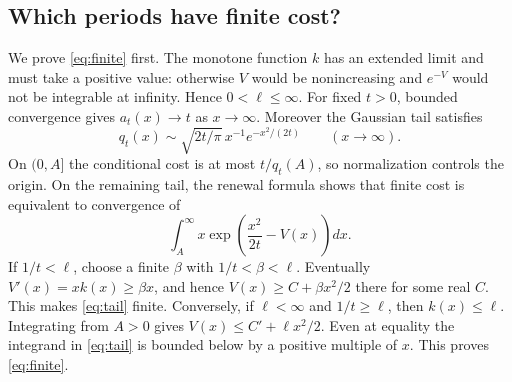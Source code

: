 \documentclass[11pt]{article}
\begin{document}
\subsection*{Which periods have finite cost?}
We prove \eqref{eq:finite} first. The monotone function $k$ has an extended
limit and must take a positive value: otherwise $V$ would be nonincreasing
and $e^{-V}$ would not be integrable at infinity. Hence $0<\ell\le\infty$.
For fixed $t>0$, bounded convergence gives $a_t(x)\to t$ as $x\to\infty$.
Moreover the Gaussian tail satisfies
\[
 q_t(x)\sim \sqrt{2t/\pi}\,x^{-1}e^{-x^2/(2t)}
 \qquad(x\to\infty).
\]
On $(0,A]$ the conditional cost is at most $t/q_t(A)$, so normalization
controls the origin. On the remaining tail, the renewal formula shows that
finite cost is equivalent to convergence of
\begin{equation}\label{eq:tail}
 \int_A^\infty x\exp\!\left(\frac{x^2}{2t}-V(x)\right)dx .
\end{equation}
If $1/t<\ell$, choose a finite $\beta$ with $1/t<\beta<\ell$. Eventually
$V'(x)=xk(x)\ge\beta x$, and hence $V(x)\ge C+\beta x^2/2$ there for
some real $C$. This makes \eqref{eq:tail} finite. Conversely, if
$\ell<\infty$ and $1/t\ge\ell$, then $k(x)\le\ell$. Integrating from
$A>0$ gives $V(x)\le C'+\ell x^2/2$. Even at equality the integrand in
\eqref{eq:tail} is bounded below by a positive multiple of $x$. This proves
\eqref{eq:finite}.
\end{document}
